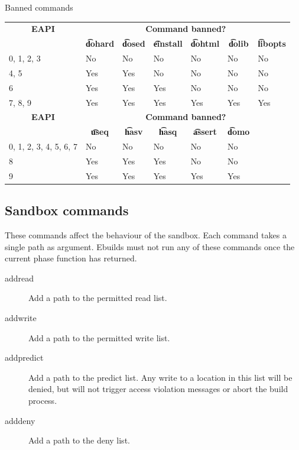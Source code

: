 \begin{centertable}{Banned commands}
    \label{tab:banned-commands-table}
    \begin{tabular}{lllllll}
      \toprule
      \multicolumn{1}{c}{\textbf{EAPI}} &
      \multicolumn{6}{c}{\textbf{Command banned?}} \\
      \multicolumn{1}{c}{} &
      \multicolumn{1}{c}{\textbf{\t{dohard}}} &
      \multicolumn{1}{c}{\textbf{\t{dosed}}} &
      \multicolumn{1}{c}{\textbf{\t{einstall}}} &
      \multicolumn{1}{c}{\textbf{\t{dohtml}}} &
      \multicolumn{1}{c}{\textbf{\t{dolib}}} &
      \multicolumn{1}{c}{\textbf{\t{libopts}}} \\
      \midrule
      0, 1, 2, 3        & No  & No  & No  & No  & No  & No  \\
      4, 5              & Yes & Yes & No  & No  & No  & No  \\
      6                 & Yes & Yes & Yes & No  & No  & No  \\
      7, 8, 9           & Yes & Yes & Yes & Yes & Yes & Yes \\
      \midrule
      \multicolumn{1}{c}{\textbf{EAPI}} &
      \multicolumn{6}{c}{\textbf{Command banned?}} \\
      \multicolumn{1}{c}{} &
      \multicolumn{1}{c}{\textbf{\t{useq}}} &
      \multicolumn{1}{c}{\textbf{\t{hasv}}} &
      \multicolumn{1}{c}{\textbf{\t{hasq}}} &
      \multicolumn{1}{c}{\textbf{\t{assert}}} &
      \multicolumn{1}{c}{\textbf{\t{domo}}} & \\
      \midrule
      0, 1, 2, 3, 4, 5, 6, 7  & No  & No  & No  & No  & No  & \\
      8                       & Yes & Yes & Yes & No  & No  & \\
      9                       & Yes & Yes & Yes & Yes & Yes & \\
      \bottomrule
    \end{tabular}
\end{centertable}

\subsection{Sandbox commands}
These commands affect the behaviour of the sandbox. Each command takes a single path as argument.
Ebuilds must not run any of these commands once the current phase function has returned.
\begin{description}
\item[addread] Add a path to the permitted read list.
\item[addwrite] Add a path to the permitted write list.
\item[addpredict] Add a path to the predict list. Any write to a location in this list will be
    denied, but will not trigger access violation messages or abort the build process.
\item[adddeny] Add a path to the deny list.
\end{description}

